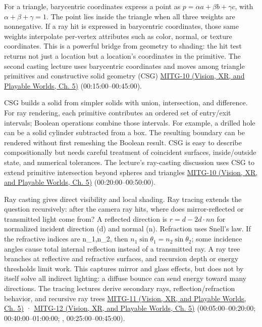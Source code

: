 For a triangle, barycentric coordinates express a point as \(p=\alpha a+\beta b+\gamma c\), with \(\alpha+\beta+\gamma=1\). The point lies inside the triangle when all three weights are nonnegative. If a ray hit is expressed in barycentric coordinates, those same weights interpolate per-vertex attributes such as color, normal, or texture coordinates. This is a powerful bridge from geometry to shading: the hit test returns not just a location but a location's coordinates in the primitive. The second casting lecture uses barycentric coordinates and moves among triangle primitives and constructive solid geometry (CSG) \href{../07-Vision-XR-and-Playable-Worlds/main.pdf\#nameddest=04-visual-computing-ii-ch036-mitg-10---ray-casting-ii}{MITG-10 (Vision, XR, and Playable Worlds, Ch. 5)} (00:15:00--00:45:00).

CSG builds a solid from simpler solids with union, intersection, and difference. For ray rendering, each primitive contributes an ordered set of entry/exit intervals; Boolean operations combine those intervals. For example, a drilled hole can be a solid cylinder subtracted from a box. The resulting boundary can be rendered without first remeshing the Boolean result. CSG is easy to describe compositionally but needs careful treatment of coincident surfaces, inside/outside state, and numerical tolerances. The lecture's ray-casting discussion uses CSG to extend primitive intersection beyond spheres and triangles \href{../07-Vision-XR-and-Playable-Worlds/main.pdf\#nameddest=04-visual-computing-ii-ch036-mitg-10---ray-casting-ii}{MITG-10 (Vision, XR, and Playable Worlds, Ch. 5)} (00:20:00--00:50:00).

Ray casting gives direct visibility and local shading. Ray tracing extends the question recursively: after the camera ray hits, where does mirror-reflected or transmitted light come from? A reflected direction is \(r=d-2d\cdot nn\) for normalized incident direction (d) and normal (n). Refraction uses Snell's law. If the refractive indices are n\_1,n\_2, then \(n_1\sin\theta_1=n_2\sin\theta_2\); some incidence angles cause total internal reflection instead of a transmitted ray. A ray tree branches at reflective and refractive surfaces, and recursion depth or energy thresholds limit work. This captures mirror and glass effects, but does not by itself solve all indirect lighting: a diffuse bounce can send energy toward many directions. The tracing lectures derive secondary rays, reflection/refraction behavior, and recursive ray trees \href{../07-Vision-XR-and-Playable-Worlds/main.pdf\#nameddest=04-visual-computing-ii-ch036-mitg-11---ray-tracing}{MITG-11 (Vision, XR, and Playable Worlds, Ch. 5)} · \href{../07-Vision-XR-and-Playable-Worlds/main.pdf\#nameddest=04-visual-computing-ii-ch036-mitg-12---ray-tracing-ii}{MITG-12 (Vision, XR, and Playable Worlds, Ch. 5)} (00:05:00--00:20:00; 00:40:00--01:00:00; , 00:25:00--00:45:00).


